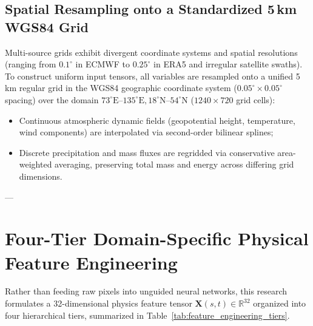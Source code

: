 \subsection{Spatial Resampling onto a Standardized 5\,km WGS84 Grid}
\label{subsec:regridding}

Multi-source grids exhibit divergent coordinate systems and spatial resolutions (ranging from $0.1^\circ$ in ECMWF to $0.25^\circ$ in ERA5 and irregular satellite swaths). To construct uniform input tensors, all variables are resampled onto a unified 5\,km regular grid in the WGS84 geographic coordinate system ($0.05^\circ \times 0.05^\circ$ spacing) over the domain $73^\circ\text{E}\text{--}135^\circ\text{E}, 18^\circ\text{N}\text{--}54^\circ\text{N}$ ($1240 \times 720$ grid cells):
\begin{itemize}
    \item Continuous atmospheric dynamic fields (geopotential height, temperature, wind components) are interpolated via second-order bilinear splines;
    \item Discrete precipitation and mass fluxes are regridded via conservative area-weighted averaging, preserving total mass and energy across differing grid dimensions.
\end{itemize}

---

\section{Four-Tier Domain-Specific Physical Feature Engineering}
\label{sec:feature_engineering}

Rather than feeding raw pixels into unguided neural networks, this research formulates a 32-dimensional physics feature tensor $\mathbf{X}(s, t) \in \mathbb{R}^{32}$ organized into four hierarchical tiers, summarized in Table~\ref{tab:feature_engineering_tiers}.

